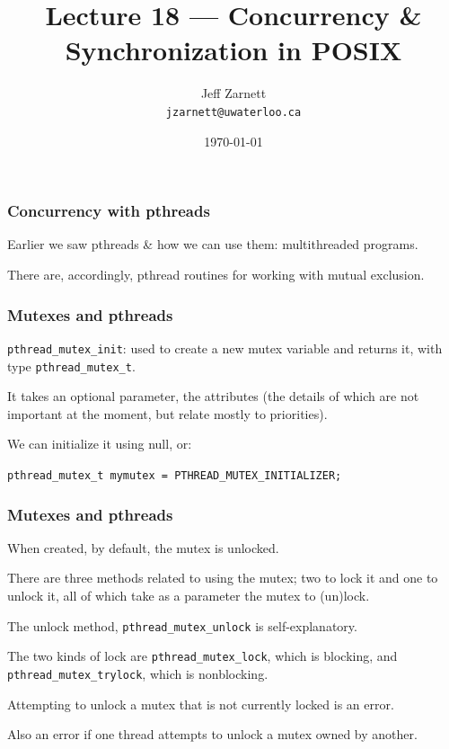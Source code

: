 

\title{Lecture 18 --- Concurrency \& Synchronization in POSIX }

\author{Jeff Zarnett \\ \small \texttt{jzarnett@uwaterloo.ca}}
\date{\today}




\begin{frame}
  \titlepage

 \end{frame}


\begin{frame}
\frametitle{Concurrency with pthreads}

Earlier we saw pthreads \& how we can use them: multithreaded programs. 

There are, accordingly, pthread routines for working with mutual exclusion.

\end{frame}


\begin{frame}
\frametitle{Mutexes and pthreads}

\texttt{pthread\_mutex\_init}: used to create a new mutex variable and returns it, with type \texttt{pthread\_mutex\_t}. 

It takes an optional parameter, the attributes (the details of which are not important at the moment, but relate mostly to priorities).

We can initialize it using null, or:

\texttt{pthread\_mutex\_t mymutex = PTHREAD\_MUTEX\_INITIALIZER;} 

\end{frame}

\begin{frame}
\frametitle{Mutexes and pthreads}

When created, by default, the mutex is unlocked. 

There are three methods related to using the mutex; two to lock it and one to unlock it, all of which take as a parameter the mutex to (un)lock. 

The unlock method, \texttt{pthread\_mutex\_unlock} is self-explanatory. 

The two kinds of lock are \texttt{pthread\_mutex\_lock}, which is blocking, and \texttt{pthread\_mutex\_trylock}, which is nonblocking. 

Attempting to unlock a mutex that is not currently locked is an error.

Also an error if one thread attempts to unlock a mutex owned by another.

\end{frame}

